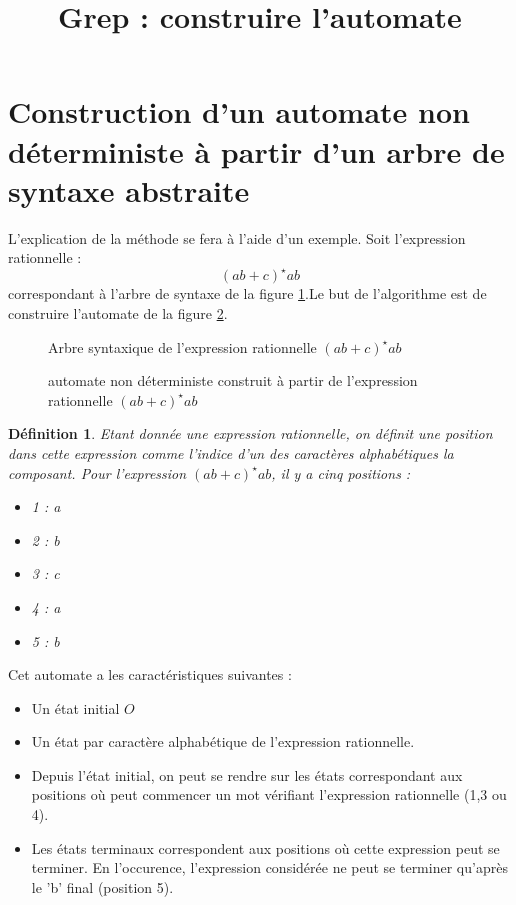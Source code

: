 \documentclass{article}
\title{Grep : construire l'automate}
\newtheorem{definition}{Définition}
\begin{document}
\maketitle


\section{Construction d'un automate non déterministe à partir d'un arbre de syntaxe abstraite}

L'explication de la méthode se fera à l'aide d'un exemple. Soit l'expression rationnelle : 
$$(ab+c)^\star ab$$ correspondant à l'arbre de syntaxe de la figure \ref{as}.Le but de l'algorithme est de construire l'automate de la figure \ref{au}.
\begin{figure}[h]
\begin{center}
\caption{\label{as} Arbre syntaxique de l'expression rationnelle $(ab+c)^\star ab$}
\end{center}
\end{figure}


\begin{figure}[h]
\begin{center}
\caption{\label{au} automate non déterministe construit à partir de l'expression rationnelle $(ab+c)^\star ab$}
\end{center}
\end{figure}

\begin{definition}
Etant donnée une expression rationnelle, on définit une position dans cette expression comme l'indice d'un des 
caractères alphabétiques la composant. 
Pour l'expression $(ab+c)^\star ab$, il y a cinq positions : 
\begin{itemize}
\item 1 : a
\item 2 : b
\item 3 : c
\item 4 : a
\item 5 : b
\end{itemize}
\end{definition}

Cet automate a les caractéristiques suivantes : 
\begin{itemize}
\item Un état initial $O$
\item Un état par caractère alphabétique de l'expression rationnelle.
\item Depuis l'état initial, on peut se rendre sur les états correspondant aux positions où peut commencer un mot vérifiant l'expression rationnelle (1,3 ou 4). 
\item Les états terminaux correspondent aux positions où cette expression peut se terminer. En l'occurence, l'expression considérée ne peut se terminer qu'après le 'b' final (position 5).
\end{itemize}
\end{document}
